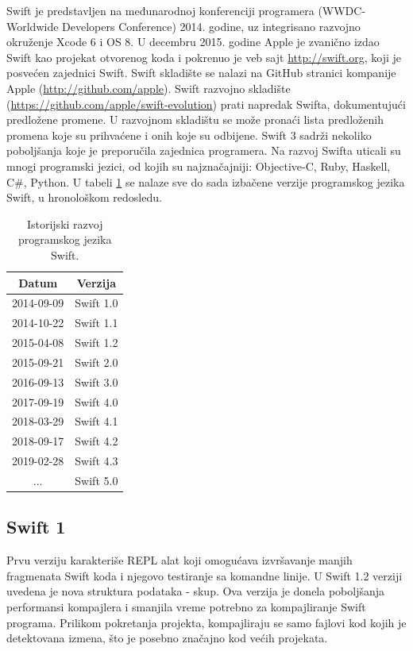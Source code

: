 \documentclass[a4paper]{article}
\begin{document}
Swift je predstavljen na međunarodnoj konferenciji programera (WWDC-Worldwide Developers Conference) 2014. godine, uz integrisano razvojno okruženje Xcode 6 i OS 8. U decembru 2015. godine Apple je zvanično izdao Swift kao projekat otvorenog koda i pokrenuo je veb sajt \url{http://swift.org}, koji je posvećen zajednici Swift. Swift skladište se nalazi na GitHub stranici kompanije Apple (\url{http://github.com/apple}). Swift razvojno skladište (\url{https://github.com/apple/swift-evolution}) prati napredak Swifta, dokumentujući predložene promene. U razvojnom skladištu se može pronaći lista predloženih promena koje su prihvaćene i onih koje su odbijene. Swift 3 sadrži nekoliko poboljšanja koje je preporučila zajednica programera. Na razvoj Swifta uticali su mnogi programski jezici, od kojih su najznačajniji: Objective-C, Ruby, Haskell, C\#, Python. U tabeli \ref{tab:tabela1} se nalaze sve do sada izbačene verzije programskog jezika Swift, u hronološkom redosledu.

\begin{table}[h!]
\begin{center}
\caption{Istorijski razvoj programskog jezika Swift.}
\begin{tabular}{|c|c|} \hline
\label{tab:tabela1}
Datum & Verzija \\ \hline
2014-09-09 & Swift 1.0 \\ \hline
2014-10-22 & Swift 1.1 \\ \hline
2015-04-08 & Swift 1.2 \\ \hline
2015-09-21 & Swift 2.0 \\ \hline
2016-09-13 & Swift 3.0 \\ \hline
2017-09-19 & Swift 4.0 \\ \hline
2018-03-29 & Swift 4.1 \\ \hline
2018-09-17 & Swift 4.2 \\ \hline
2019-02-28 & Swift 4.3 \\ \hline
... & Swift 5.0 \\ \hline
\end{tabular}
\end{center}
\end{table}


\subsection{Swift 1}
\label{subsec:podnaslov1}
Prvu verziju karakteriše REPL alat koji omogućava izvršavanje  manjih fragmenata Swift koda i njegovo testiranje sa komandne linije. U Swift 1.2  verziji uvedena je nova struktura podataka - skup. Ova verzija je donela poboljšanja performansi kompajlera i smanjila vreme potrebno za kompajliranje Swift programa. Prilikom pokretanja projekta, kompajliraju se samo fajlovi kod kojih je detektovana izmena, što je posebno značajno kod većih projekata.  
\end{document}

